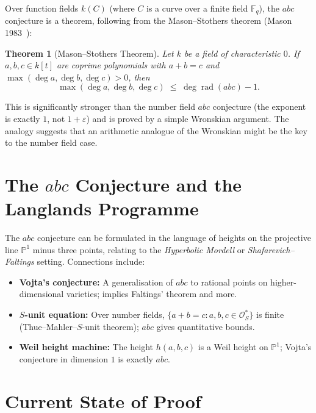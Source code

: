 \documentclass[12pt,a4paper]{article}
\newtheorem{theorem}{Theorem}[section]
\theoremstyle{remark}
\begin{document}
Over function fields $k(C)$ (where $C$ is a curve over a finite field $\mathbb{F}_q$),
the $abc$ conjecture is a theorem, following from the Mason--Stothers theorem
(Mason 1983~\cite{Mason1984}):

\begin{theorem}[Mason--Stothers Theorem]
  Let $k$ be a field of characteristic $0$.  If $a,b,c\in k[t]$ are coprime polynomials
  with $a+b=c$ and $\max(\deg a,\deg b,\deg c)>0$, then
  \[
    \max(\deg a,\deg b,\deg c) \;\leq\; \deg\operatorname{rad}(abc) - 1.
  \]
\end{theorem}

This is significantly stronger than the number field $abc$ conjecture (the exponent is
exactly $1$, not $1+\varepsilon$) and is proved by a simple Wronskian argument.  The
analogy suggests that an arithmetic analogue of the Wronskian might be the key to
the number field case.

\section{The $abc$ Conjecture and the Langlands Programme}

The $abc$ conjecture can be formulated in the language of heights on the projective line
$\mathbb{P}^1$ minus three points, relating to the \emph{Hyperbolic Mordell} or
\emph{Shafarevich--Faltings} setting.  Connections include:

\begin{itemize}[nosep]
  \item \textbf{Vojta's conjecture:}  A generalisation of $abc$ to rational points on
    higher-dimensional varieties; implies Faltings' theorem and more.
  \item \textbf{$S$-unit equation:}  Over number fields, $\{a+b=c : a,b,c\in\mathcal{O}_S^*\}$
    is finite (Thue--Mahler--$S$-unit theorem); $abc$ gives quantitative bounds.
  \item \textbf{Weil height machine:}  The height $h(a,b,c)$ is a Weil height on
    $\mathbb{P}^1$; Vojta's conjecture in dimension $1$ is exactly $abc$.
\end{itemize}

\section{Current State of Proof}
\end{document}

